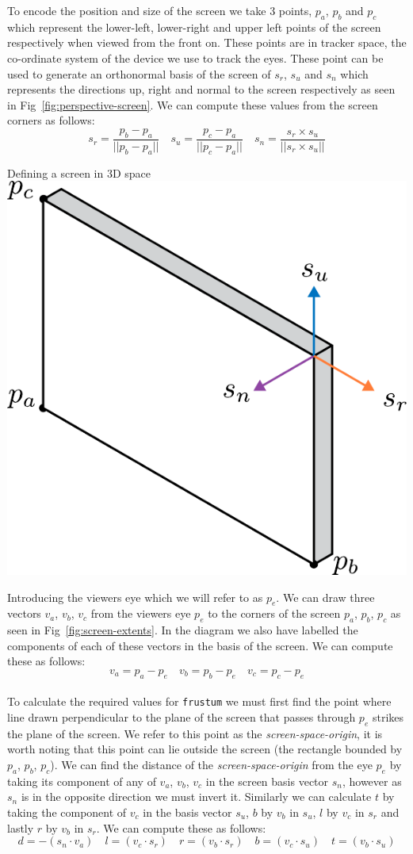 To encode the position and size of the screen we take 3 points, $p_a$, $p_b$ and $p_c$ which represent the lower-left, lower-right and upper left points of the screen respectively when viewed from the front on. These points are in tracker space, the co-ordinate system of the device we use to track the eyes. These point can be used to generate an orthonormal basis of the screen of $s_r$, $s_u$ and $s_n$ which represents the directions up, right and normal to the screen respectively as seen in Fig~\ref{fig:perspective-screen}. We can compute these values from the screen corners as follows:
\[s_r = \frac{p_b-p_a}{||p_b-p_a||} \quad s_u = \frac{p_c-p_a}{||p_c-p_a||} \quad s_n = \frac{s_r\times s_u}{||s_r \times s_u||}\]

\begin{figureBox}[label={fig:perspective-screen}]{Defining a screen in 3D space}
\includegraphics[width = 0.3\linewidth]{./figures/background/projection/screen.pdf}
\end{figureBox}

Introducing the viewers eye which we will refer to as $p_e$. We can draw three vectors $v_a$, $v_b$, $v_c$ from the viewers eye $p_e$ to the corners of the screen $p_a$, $p_b$, $p_c$ as seen in Fig~\ref{fig:screen-extents}. In the diagram we also have labelled the components of each of these vectors in the basis of the screen. We can compute these as follows: 
\[ v_a = p_a - p_e \quad v_b = p_b - p_e \quad v_c = p_c - p_e\] \\

To calculate the required values for \texttt{frustum} we must first find the point where line drawn perpendicular to the plane of the screen that passes through $p_e$ strikes the plane of the screen. We refer to this point as the {\it screen-space-origin}, it is worth noting that this point can lie outside the screen (the rectangle bounded by $p_a$, $p_b$, $p_c$). We can find the distance of the {\it screen-space-origin} from the eye $p_e$ by taking its component of any of $v_a$, $v_b$, $v_c$ in the screen basis vector $s_n$, however as $s_n$ is in the opposite direction we must invert it. Similarly we can calculate $t$ by taking the component of $v_c$ in the basis vector $s_u$, $b$ by $v_b$ in $s_u$, $l$ by $v_c$ in $s_r$ and lastly $r$ by $v_b$ in $s_r$. We can compute these as follows: 
\[ d= -(s_n \cdot v_a) \quad l = (v_c \cdot s_r) \quad r = (v_b \cdot s_r) \quad b = (v_c \cdot s_u) \quad t = (v_b \cdot s_u) \]

